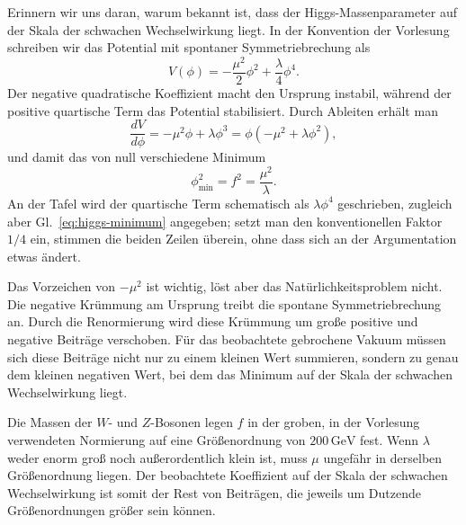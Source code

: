 \begin{classroomqa}
\end{classroomqa}

Erinnern wir uns daran, warum bekannt ist, dass der Higgs-Massenparameter auf der Skala der schwachen Wechselwirkung liegt. In der Konvention der Vorlesung schreiben wir das Potential mit spontaner Symmetriebrechung als
\begin{equation}
V(\phi)=-\frac{\mu^2}{2}\phi^2+\frac{\lambda}{4}\phi^4.
\label{eq:higgs-potential}
\end{equation}
Der negative quadratische Koeffizient macht den Ursprung instabil, während der positive quartische Term das Potential stabilisiert. Durch Ableiten erhält man
\begin{equation}
\frac{dV}{d\phi}=-\mu^2\phi+\lambda\phi^3
=\phi(-\mu^2+\lambda\phi^2),
\end{equation}
und damit das von null verschiedene Minimum
\begin{equation}
\phi_{\min}^2=f^2=\frac{\mu^2}{\lambda}.
\label{eq:higgs-minimum}
\end{equation}
An der Tafel wird der quartische Term schematisch als \(\lambda\phi^4\) geschrieben, zugleich aber Gl.~\eqref{eq:higgs-minimum} angegeben; setzt man den konventionellen Faktor \(1/4\) ein, stimmen die beiden Zeilen überein, ohne dass sich an der Argumentation etwas ändert.

Das Vorzeichen von \(-\mu^2\) ist wichtig, löst aber das Natürlichkeitsproblem nicht. Die negative Krümmung am Ursprung treibt die spontane Symmetriebrechung an. Durch die Renormierung wird diese Krümmung um große positive und negative Beiträge verschoben. Für das beobachtete gebrochene Vakuum müssen sich diese Beiträge nicht nur zu einem kleinen Wert summieren, sondern zu genau dem kleinen negativen Wert, bei dem das Minimum auf der Skala der schwachen Wechselwirkung liegt.

Die Massen der \(W\)- und \(Z\)-Bosonen legen \(f\) in der groben, in der Vorlesung verwendeten Normierung auf eine Größenordnung von \(200\,\mathrm{GeV}\) fest. Wenn \(\lambda\) weder enorm groß noch außerordentlich klein ist, muss \(\mu\) ungefähr in derselben Größenordnung liegen. Der beobachtete Koeffizient auf der Skala der schwachen Wechselwirkung ist somit der Rest von Beiträgen, die jeweils um Dutzende Größenordnungen größer sein können.

